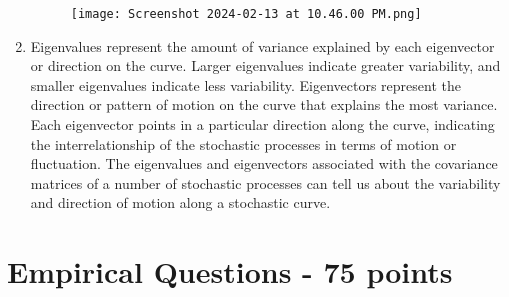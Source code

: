 \documentclass{article}
\begin{document}
\begin{enumerate}
    \begin{figure}[h]
        \centering
        \texttt{[image: Screenshot 2024-02-13 at 10.46.00 PM.png]}    
    \end{figure}
    \item Eigenvalues represent the amount of variance explained by each eigenvector or direction on the curve. Larger eigenvalues indicate greater variability, and smaller eigenvalues indicate less variability. Eigenvectors represent the direction or pattern of motion on the curve that explains the most variance. Each eigenvector points in a particular direction along the curve, indicating the interrelationship of the stochastic processes in terms of motion or fluctuation. The eigenvalues and eigenvectors associated with the covariance matrices of a number of stochastic processes can tell us about the variability and direction of motion along a stochastic curve.
\end{enumerate}



\section*{Empirical Questions - 75 points} 
\end{document}
